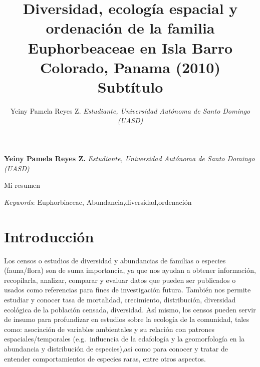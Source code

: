 \documentclass[11pt,]{article}
\title{Diversidad, ecología espacial y ordenación de la familia Euphorbeaceae
en Isla Barro Colorado, Panama (2010)\\[2\baselineskip]Subtítulo  }
\author{\Large Yeiny Pamela Reyes Z.\vspace{0.05in} \newline\normalsize\emph{Estudiante, Universidad Autónoma de Santo Domingo (UASD)}  }
\date{}
\newcommand*{\authorfont}{\fontfamily{phv}\selectfont}
\renewenvironment{abstract}
 {{%
    \setlength{\leftmargin}{0mm}
    \setlength{\rightmargin}{\leftmargin}%
  }%
  \relax}
 {\endlist}
\begin{document}
	
%

{%
\setlength{\parindent}{0pt}
\thispagestyle{plain}
{\fontsize{18}{20}\selectfont\raggedright 
\maketitle  %

}

{
   \vskip 13.5pt\relax \normalsize\fontsize{11}{12} 
\textbf{\authorfont Yeiny Pamela Reyes Z.} \hskip 15pt \emph{\small Estudiante, Universidad Autónoma de Santo Domingo (UASD)}   

}

}








\begin{abstract}

    \hbox{\vrule height .2pt width 39.14pc}

    \vskip 8.5pt %

\noindent Mi resumen


\vskip 8.5pt \noindent \emph{Keywords}: Euphorbiaceae, Abundancia,diversidad,ordenación \par

    \hbox{\vrule height .2pt width 39.14pc}



\end{abstract}


\vskip 6.5pt


\noindent  \section{Introducción}\label{introducciuxf3n}

Los censos o estudios de diversidad y abundancias de familias o especies
(fauna/flora) son de suma importancia, ya que nos ayudan a obtener
información, recopilarla, analizar, comparar y evaluar datos que pueden
ser publicados o usados como referencias para fines de investigación
futura. También nos permite estudiar y conocer tasa de mortalidad,
crecimiento, distribución, diversidad ecológica de la población censada,
diversidad. Así mismo, los censos pueden servir de insumo para
profundizar en estudios sobre la ecología de la comunidad, tales como:
asociación de variables ambientales y su relación con patrones
espaciales/temporales (e.g.~influencia de la edafología y la
geomorfología en la abundancia y distribución de especies),así como para
conocer y tratar de entender comportamientos de especies raras, entre
otros aspectos.
\end{document}
